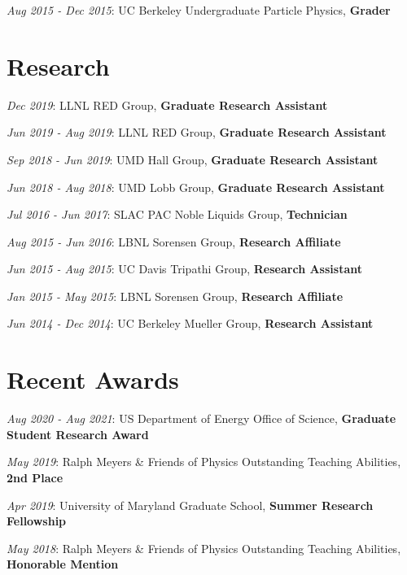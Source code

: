 \documentclass[
  10pt,
  letterpaper,
  DIV=11,
  numbers=noendperiod]{scrartcl}
\begin{document}
\textcolor{mygray}{\textit{Aug 2015 - Dec 2015}}: UC Berkeley
Undergraduate Particle Physics, \textbf{Grader}

\hypertarget{fa-atom-research}{%
\section{\texorpdfstring{
Research}{ Research}}\label{fa-atom-research}}

\textcolor{mygray}{\textit{Dec 2019}}: LLNL RED Group, \textbf{Graduate
Research Assistant}

\textcolor{mygray}{\textit{Jun 2019 - Aug 2019}}: LLNL RED Group,
\textbf{Graduate Research Assistant}

\textcolor{mygray}{\textit{Sep 2018 - Jun 2019}}: UMD Hall Group,
\textbf{Graduate Research Assistant}

\textcolor{mygray}{\textit{Jun 2018 - Aug 2018}}: UMD Lobb Group,
\textbf{Graduate Research Assistant}

\textcolor{mygray}{\textit{Jul 2016 - Jun 2017}}: SLAC PAC Noble Liquids
Group, \textbf{Technician}

\textcolor{mygray}{\textit{Aug 2015 - Jun 2016}}: LBNL Sorensen Group,
\textbf{Research Affiliate}

\textcolor{mygray}{\textit{Jun 2015 - Aug 2015}}: UC Davis Tripathi
Group, \textbf{Research Assistant}

\textcolor{mygray}{\textit{Jan 2015 - May 2015}}: LBNL Sorensen Group,
\textbf{Research Affiliate}

\textcolor{mygray}{\textit{Jun 2014 - Dec 2014}}: UC Berkeley Mueller
Group, \textbf{Research Assistant}

\hypertarget{fa-trophy-recent-awards}{%
\section{\texorpdfstring{ Recent
Awards}{ Recent Awards}}\label{fa-trophy-recent-awards}}

\textcolor{mygray}{\textit{Aug 2020 - Aug 2021}}: US Department of
Energy Office of Science, \textbf{Graduate Student Research Award}

\textcolor{mygray}{\textit{May 2019}}: Ralph Meyers \& Friends of
Physics Outstanding Teaching Abilities, \textbf{2nd Place}

\textcolor{mygray}{\textit{Apr 2019}}: University of Maryland Graduate
School, \textbf{Summer Research Fellowship}

\textcolor{mygray}{\textit{May 2018}}: Ralph Meyers \& Friends of
Physics Outstanding Teaching Abilities, \textbf{Honorable Mention}
\end{document}

